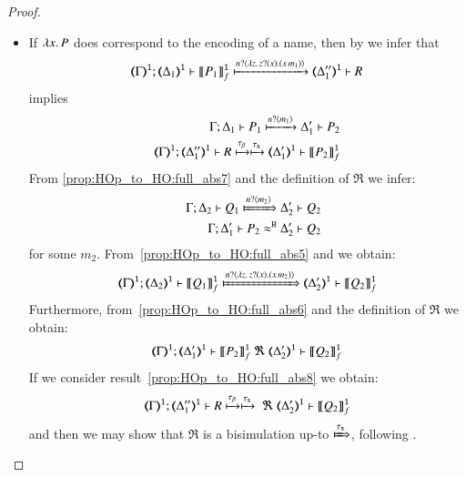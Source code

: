 \begin{proof}
\begin{enumerate}[1.]
\begin{itemize}
	\item If $\lambda x.\,P$ does correspond to the encoding of a name, then by 
	  we infer that
%
	\[
		\horel{\tmap{\Gamma}{1}}{\tmap{\Delta_1}{1}}{\pmapp{P_1}{1}{f}}{\hby{\bactinp{n}{\abs{z}{ \binp{z}{x} (\appl{x}{m_1})}}}}{\tmap{\Delta_1''}{1}} R %
	\]
%
	\noi implies
%
	\begin{eqnarray}
		\horel{\Gamma}{\Delta_1}{P_1}{\hby{\bactinp{n}{m_1}}}{\Delta_1'}{P_2}
		\label{prop:HOp_to_HO:full_abs7}
\\
		\horel{\tmap{\Gamma}{1}}{\tmap{\Delta_1''}{1}}{R}{\hby{\btau} \hby{\stau}}{\tmap{\Delta_1'}{1}}{\pmapp{P_2}{1}{f}}
		\label{prop:HOp_to_HO:full_abs8}
	\end{eqnarray}
%
%
	\noi From \eqref{prop:HOp_to_HO:full_abs7} and the definition of $\Re$ we infer:
%
	\begin{eqnarray}
		&&\horel{\Gamma}{\Delta_2}{Q_1}{\Hby{\bactinp{n}{m_2}}}{\Delta_2'}{Q_2}
		\label{prop:HOp_to_HO:full_abs5}
		\\
		&&\horel{\Gamma}{\Delta_1'}{P_2}{\hwb}{\Delta_2'}{Q_2}
		\label{prop:HOp_to_HO:full_abs6}
	\end{eqnarray}
%
	\noi for some $m_2$. From~\eqref{prop:HOp_to_HO:full_abs5} and  we obtain:
%
	\[
		\horel{\tmap{\Gamma}{1}}{\tmap{\Delta_2}{1}}{\pmapp{Q_1}{1}{f}}{\Hby{\bactinp{n}{\abs{z}{\binp{z}{x} (\appl{x}{m_2})}}}}{\tmap{\Delta_2'}{1}}{\pmapp{Q_2}{1}{f}}
	\]
%
	\noi Furthermore, from~\eqref{prop:HOp_to_HO:full_abs6} and the definition of $\Re$ we obtain:
%
	\[
		\horel{\tmap{\Gamma}{1}}{\tmap{\Delta_1'}{1}}{\pmapp{P_2}{1}{f}}{\ \Re\ }{\tmap{\Delta_2'}{1}}{\pmapp{Q_2}{1}{f}}
	\]
%
	\noi If we consider result~\eqref{prop:HOp_to_HO:full_abs8} we obtain:
%
	\[
		\horel{\tmap{\Gamma}{1}}{\tmap{\Delta_1''}{1}}{R}{\hby{\btau}\hby{\stau}\ \Re\ }{\tmap{\Delta_2'}{1}}{\pmapp{Q_2}{1}{f}}
	\]
	and then we may show that $\Re$ is a bisimulation up-to $\Hby{\stau}$,
	following . 
	\end{itemize}
\end{enumerate}
\end{proof}




